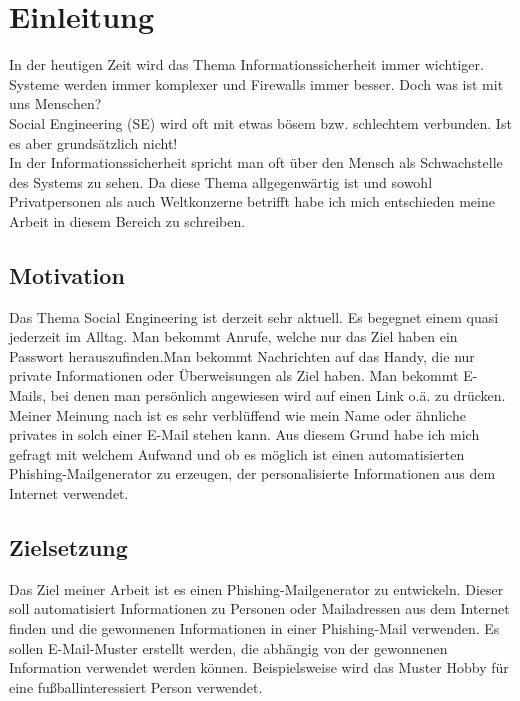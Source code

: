 \chapter{Einleitung}
\label{cha:einleitung}





In der heutigen Zeit wird das Thema Informationssicherheit immer wichtiger. Systeme werden immer komplexer und Firewalls immer besser. Doch was ist mit uns Menschen? \\
Social Engineering (SE) wird oft mit etwas bösem bzw. schlechtem verbunden. Ist es aber grundsätzlich nicht! \\
In der Informationssicherheit spricht man oft über den Mensch als Schwachstelle des Systems zu sehen. Da diese Thema allgegenwärtig ist und sowohl Privatpersonen als auch Weltkonzerne betrifft habe ich mich entschieden meine Arbeit in diesem Bereich zu schreiben.


\section{Motivation}
\label {sec:Motivation}
Das Thema Social Engineering ist derzeit sehr aktuell. Es begegnet einem quasi jederzeit im Alltag. Man bekommt Anrufe, welche nur das Ziel haben ein Passwort herauszufinden.Man bekommt Nachrichten auf das Handy, die nur private Informationen oder Überweisungen als Ziel haben. Man bekommt E-Mails, bei denen man persönlich angewiesen wird auf einen Link o.ä. zu drücken. Meiner Meinung nach ist es sehr verblüffend wie mein Name oder ähnliche privates in solch einer E-Mail stehen kann. Aus diesem Grund habe ich mich gefragt mit welchem Aufwand und ob es möglich ist einen automatisierten Phishing-Mailgenerator zu erzeugen, der personalisierte Informationen aus dem Internet verwendet.

\section{Zielsetzung}
\label {sec:Zielsetzung} 
Das Ziel meiner Arbeit ist es einen Phishing-Mailgenerator zu entwickeln. Dieser soll automatisiert Informationen zu Personen oder Mailadressen aus dem Internet finden und die gewonnenen Informationen in einer Phishing-Mail verwenden. Es sollen E-Mail-Muster erstellt werden, die abhängig von der gewonnenen Information verwendet werden können. Beispielsweise wird das Muster Hobby für eine fußballinteressiert Person verwendet.

